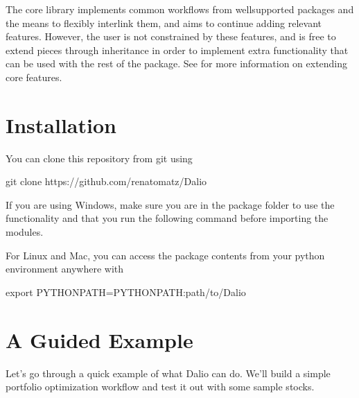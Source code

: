 \documentclass[letterpaper,10pt,english]{sphinxmanual}
\begin{document}
The core library implements common workflows from well\sphinxhyphen{}supported packages and the means to flexibly interlink them, and aims to continue adding relevant features. However, the user is not constrained by these features, and is free to extend pieces through inheritance in order to implement extra functionality that can be used with the rest of the package. See {\hyperref[\detokenize{developers-guide:developers-guide}]{}} for more information on extending core features.


\chapter{Installation}
\label{\detokenize{index:installation}}\label{\detokenize{index:instalation}}
You can clone this repository from git using

\begin{sphinxVerbatim}[commandchars=\\\{\}]
git clone https://github.com/renatomatz/Dal\PYGZhy{}io
\end{sphinxVerbatim}

If you are using Windows, make sure you are in the package folder to use the functionality and that you run the following command before importing the modules.

\begin{sphinxVerbatim}[commandchars=\\\{\}]
 
\end{sphinxVerbatim}

For Linux and Mac, you can access the package contents from your python environment anywhere with

\begin{sphinxVerbatim}[commandchars=\\\{\}]
export PYTHONPATH=\PYGZdl{}PYTHONPATH:\PYGZdq{}path/to/Dal\PYGZhy{}io\PYGZdq{}
\end{sphinxVerbatim}


\chapter{A Guided Example}
\label{\detokenize{index:a-guided-example}}\label{\detokenize{index:id2}}
Let’s go through a quick example of what Dal\sphinxhyphen{}io can do. We’ll build a simple portfolio optimization workflow and test it out with some sample stocks.
\end{document}
